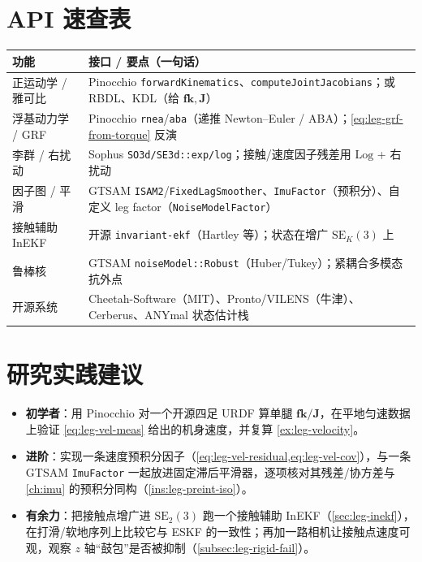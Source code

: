 \section*{API 速查表}
\begin{table}[H]\centering\small
\begin{tabular}{p{} p{}}
\toprule
功能 & 接口 / 要点（一句话） \\
\midrule
正运动学 / 雅可比 & Pinocchio \texttt{forwardKinematics}、\texttt{computeJointJacobians}；或 RBDL、KDL（给 $\mathbf{fk},\mathbf{J}$） \\
浮基动力学 / GRF & Pinocchio \texttt{rnea}/\texttt{aba}（递推 Newton--Euler / ABA）；\cref{eq:leg-grf-from-torque} 反演 \\
李群 / 右扰动 & Sophus \texttt{SO3d/SE3d::exp/log}；接触/速度因子残差用 $\mathrm{Log}$ + 右扰动 \\
因子图 / 平滑 & GTSAM \texttt{ISAM2}/\texttt{FixedLagSmoother}、\texttt{ImuFactor}（预积分）、自定义 leg factor（\texttt{NoiseModelFactor}） \\
接触辅助 InEKF & 开源 \texttt{invariant-ekf}（Hartley 等）；状态在增广 $\mathrm{SE}_K(3)$ 上 \\
鲁棒核 & GTSAM \texttt{noiseModel::Robust}（Huber/Tukey）；紧耦合多模态抗外点 \\
开源系统 & Cheetah-Software（MIT）、Pronto/VILENS（牛津）、Cerberus、ANYmal 状态估计栈 \\
\bottomrule
\end{tabular}
\end{table}

\section*{研究实践建议}
\begin{itemize}
  \item \textbf{初学者}：用 Pinocchio 对一个开源四足 URDF 算单腿 $\mathbf{fk}/\mathbf{J}$，在平地匀速数据上验证 \cref{eq:leg-vel-meas} 给出的机身速度，并复算 \cref{ex:leg-velocity}。
  \item \textbf{进阶}：实现一条速度预积分因子（\cref{eq:leg-vel-residual,eq:leg-vel-cov}），与一条 GTSAM \texttt{ImuFactor} 一起放进固定滞后平滑器，逐项核对其残差/协方差与 \cref{ch:imu} 的预积分同构（\cref{ins:leg-preint-iso}）。
  \item \textbf{有余力}：把接触点增广进 $\mathrm{SE}_2(3)$ 跑一个接触辅助 InEKF（\cref{sec:leg-inekf}），在打滑/软地序列上比较它与 ESKF 的一致性；再加一路相机让接触点速度可观，观察 $z$ 轴“鼓包”是否被抑制（\cref{subsec:leg-rigid-fail}）。
\end{itemize}

